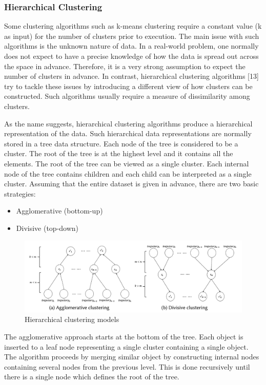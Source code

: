 \documentclass[a4paper, 12pt]{article}
\begin{document}
\subsubsection{Hierarchical Clustering}
Some clustering algorithms such as k-means clustering \citep{macqueen1967some} require a constant value (k as input) for the number of clusters prior to execution. The main issue with such algorithms is the unknown nature of data. In a real-world problem, one normally does not expect to have a precise knowledge of how the data is spread out across the space in advance. Therefore, it is a very strong assumption to expect the number of clusters in advance. In contrast, hierarchical clustering algorithms [13] try to tackle these issues by introducing a different view of how clusters can be constructed. Such algorithms usually require a measure of dissimilarity among clusters.

As the name suggests, hierarchical clustering algorithms produce a hierarchical representation of the data. Such hierarchical data representations are normally stored in a tree data structure. Each node of the tree is considered to be a cluster. The root of the tree is at the highest level and it contains all the elements. The root of the tree can be viewed as a single cluster. Each internal node of the tree contains children and each child can be interpreted as a single cluster. Assuming that the entire dataset is given in advance, there are two basic strategies:

\begin{itemize}
    \item Agglomerative (bottom-up)
    \item Divisive (top-down)
\end{itemize}

\begin{figure}[ht]
    \centering
    \includegraphics[width=1\textwidth]{AP Clustering.png}
    \caption{Hierarchical clustering models \citep{bian2019trajectory}}
\end{figure}

The agglomerative approach starts at the bottom of the tree. Each object is inserted to a leaf node representing a single cluster containing a single object. The algorithm proceeds by merging similar object by constructing internal nodes containing several nodes from the previous level. This is done recursively until there is a single node which defines the root of the tree.
\end{document}
